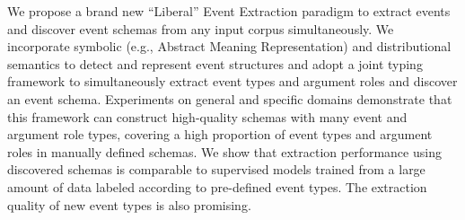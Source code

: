 We propose a brand new ``Liberal'' Event Extraction paradigm to extract events and discover event schemas from any input corpus simultaneously. We incorporate symbolic (e.g., Abstract Meaning Representation) and distributional semantics to detect and represent event structures and adopt a joint typing framework to simultaneously extract event types and argument roles and discover an event schema. Experiments on general and specific domains demonstrate that this framework can construct high-quality schemas with many event and argument role types, covering a high proportion of event types and argument roles in manually defined schemas. We show that extraction performance using discovered schemas is comparable to supervised models trained from a large amount of data labeled according to pre-defined event types. The extraction quality of new event types is also promising.
